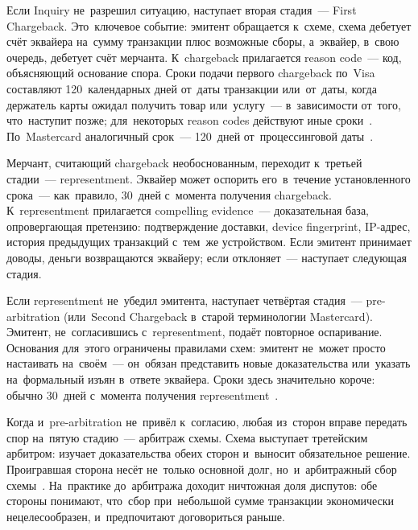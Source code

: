 Если Inquiry не~разрешил ситуацию, наступает вторая стадия~--- First Chargeback. Это~ключевое событие:
эмитент обращается к~схеме, схема дебетует счёт эквайера на~сумму
транзакции плюс возможные сборы, а~эквайер, в~свою очередь, дебетует
счёт мерчанта. К~chargeback прилагается reason code~--- код, объясняющий
основание спора. Сроки подачи первого chargeback по~Visa составляют
120~календарных дней от~даты транзакции или~от~даты, когда держатель
карты ожидал получить товар или~услугу~--- в~зависимости от~того,
что~наступит позже; для~некоторых reason codes действуют
иные сроки~.
По~Mastercard аналогичный срок~--- 120~дней от~процессинговой
даты~.

Мерчант, считающий chargeback необоснованным, переходит к~третьей стадии~--- representment. Эквайер может оспорить его~в~течение
установленного срока~--- как~правило, 30~дней с~момента получения
chargeback. К~representment прилагается compelling evidence~--- доказательная
база, опровергающая претензию: подтверждение доставки, device fingerprint,
IP-адрес, история предыдущих транзакций с~тем~же устройством. Если
эмитент принимает доводы, деньги возвращаются эквайеру; если отклоняет~---
наступает следующая стадия.

Если representment не~убедил эмитента, наступает четвёртая стадия~--- pre-arbitration (или~Second Chargeback
в~старой терминологии Mastercard). Эмитент, не~согласившись с~representment,
подаёт повторное оспаривание. Основания для~этого ограничены правилами
схем: эмитент не~может просто настаивать на~своём~--- он~обязан представить
новые доказательства или~указать на~формальный изъян в~ответе эквайера.
Сроки здесь значительно короче: обычно 30~дней с~момента получения
representment~.

Когда и~pre-arbitration не~привёл к~согласию, любая из~сторон вправе передать спор на~пятую стадию~--- арбитраж схемы. Схема выступает третейским арбитром: изучает доказательства
обеих сторон и~выносит обязательное решение. Проигравшая сторона несёт
не~только основной долг, но~и~арбитражный сбор схемы~.
На~практике до~арбитража доходит ничтожная доля диспутов: обе стороны
понимают, что~сбор при~небольшой сумме транзакции экономически
нецелесообразен, и~предпочитают договориться раньше.

